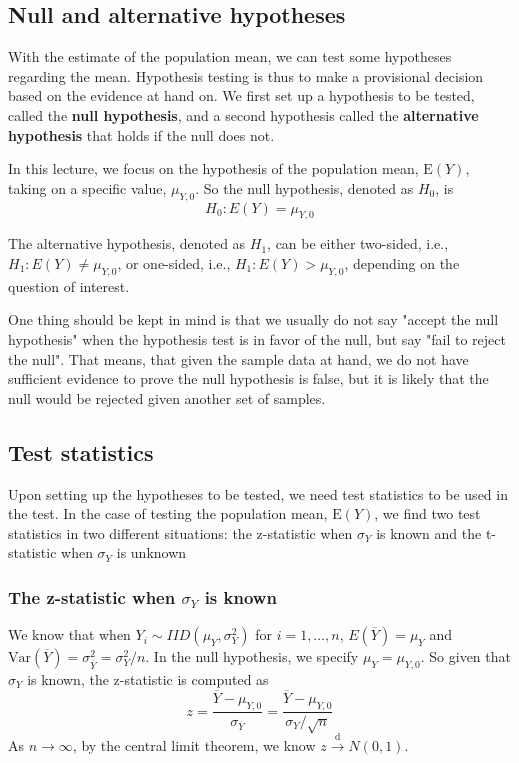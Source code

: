 \documentclass[a4paper,11pt]{article}
\begin{document}
\subsection{Null and alternative hypotheses}
\label{sec:orge9fd355}

With the estimate of the population mean, we can test some hypotheses
regarding the mean. Hypothesis testing is thus to make a provisional
decision based on the evidence at hand on. We first set up a
hypothesis to be tested, called the \textbf{null hypothesis}, and a second
hypothesis called the \textbf{alternative hypothesis} that holds if the null
does not. 

In this lecture, we focus on the hypothesis of the population mean,
\(\mathrm{E}(Y)\), taking on a specific value, \(\mu_{Y,0}\). So the null
hypothesis, denoted as \(H_0\), is
\[ H_0: E(Y) = \mu_{Y,0}  \]

The alternative hypothesis, denoted as \(H_1\), can be either two-sided,
i.e., \(H_1: E(Y) \neq \mu_{Y,0}\), or one-sided, i.e., \(H_1: E(Y) >
\mu_{Y,0}\), depending on the question of interest. 

One thing should be kept in mind is that we usually do not say "accept
the null hypothesis" when the hypothesis test is in favor of the null,
but say "fail to reject the null". That means, that given the sample
data at hand, we do not have sufficient evidence to prove the null
hypothesis is false, but it is likely that the null would be rejected
given another set of samples.

\subsection{Test statistics}
\label{sec:orgf6ba2bd}

Upon setting up the hypotheses to be tested, we need test statistics to be
used in the test. In the case of testing the population mean,
\(\mathrm{E}(Y)\), we find two test statistics in two different
situations: the z-statistic when \(\sigma_Y\) is known and the
t-statistic when \(\sigma_Y\) is unknown

\subsubsection*{The z-statistic when \(\sigma_Y\) is known}
\label{sec:orgd053220}

We know that when \(Y_i \sim IID(\mu_Y, \sigma^2_Y)\) for \(i=1, \ldots,
n\), \(E(\overline{Y}) = \mu_Y\) and
\(\mathrm{Var}(\overline{Y}) = \sigma^2_{\overline{Y}} = \sigma^2_Y /
n\). In the null hypothesis, we specify \(\mu_Y = \mu_{Y,0}\). So given
that \(\sigma_Y\) is known, the
z-statistic is computed as 
\[ z = \frac{\overline{Y} -
  \mu_{Y,0}}{\sigma_{\overline{Y}}} = \frac{\overline{Y} -
  \mu_{Y,0}}{\sigma_Y/\sqrt{n}} \]
As \(n \rightarrow \infty\), by the central limit theorem, we know \(z
\xrightarrow{\text{ d }} N(0, 1)\). 
\end{document}
